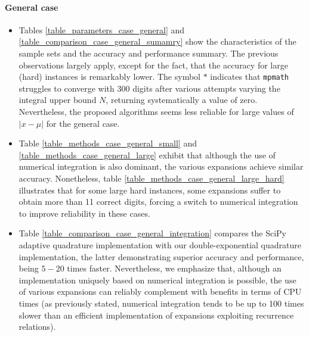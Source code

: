 \documentclass[10pt,a4paper,oneside]{article}
\numberwithin{equation}{section}
\begin{document}
\paragraph{General case}
\begin{itemize}
\item Tables \ref{table_parameters_case_general} and \ref{table_comparison_case_general_sumamry} show the characteristics of the sample sets and the accuracy and performance summary. The previous observations largely apply, except for the fact, that the accuracy for large (hard) instances is remarkably lower. The symbol $*$ indicates that \texttt{mpmath} struggles to converge with 300 digits after various attempts varying the integral upper bound $N$, returning systematically a value of zero. Nevertheless, the proposed algorithms seems less reliable for large values of $|x-\mu|$ for the general case.
\item Table \ref{table_methods_case_general_small} and  \ref{table_methods_case_general_large} exhibit that although the use of numerical integration is also dominant, the various expansions achieve similar accuracy. Nonetheless, table \ref{table_methods_case_general_large_hard} illustrates that for some large hard instances, some expansions suffer to obtain more than 11 correct digits, forcing a switch to numerical integration to improve reliability in these cases.
\item Table \ref{table_comparison_case_general_integration} compares the SciPy adaptive quadrature implementation with our double-exponential quadrature implementation, the latter demonstrating superior accuracy and performance, being $5-20$ times faster. Nevertheless, we emphasize that, although an implementation uniquely based on numerical integration is possible, the use of various expansions can reliably complement with benefits in terms of CPU times (as previously stated, numerical integration tends to be up to 100 times slower than an efficient implementation of expansions exploiting recurrence relations).
\end{itemize}

\end{document}
